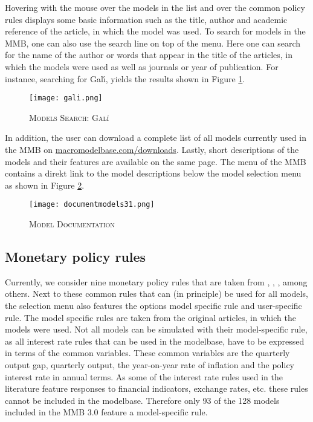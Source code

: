 Hovering with the mouse over the models in the list and over the common policy rules displays some basic information such as the title, author and academic reference of the article, in which the model was used. To search for models in the MMB, one can also use the search line on top of the menu. Here one can search for the name of the author or words that appear in the title of the articles, in which the models were used as well as journals or year of publication. For instance, searching for Gal{\'\i}, yields the results shown in Figure \ref{search}.

\begin{figure}[H]
	\centering
	\caption{\textsc{Models Search: Gal{\'\i}}}
	\vspace{0.2cm}
	\texttt{[image: gali.png]}\\
	\label{search}
\end{figure}

In addition, the user can download a complete list of all models currently used in the MMB on \url{macromodelbase.com/downloads}. Lastly, short descriptions of the models and their features are available on the same page. The menu of the MMB contains a direkt link to the model descriptions below the model selection menu as shown in Figure \ref{docmod}.
\begin{figure}[H]
	\centering
	\caption{\textsc{Model Documentation}}
	\vspace{0.2cm}
	\texttt{[image: documentmodels31.png]}\\
	\label{docmod}
\end{figure}

\subsection*{Monetary policy rules}



Currently, we consider nine monetary policy rules that are taken from \cite{Taylor1993}, \cite{LevinWielandWilliams2003}, \cite{SmetsWouters2007}, among others. Next to these common rules that can (in principle) be used for all models, the selection menu also features the options model specific rule and user-specific rule. 
The model specific rules are taken from the original articles, in which the models were used. Not all models can be simulated with their model-specific rule, as all interest rate rules that can be used in the modelbase, have to be expressed in terms of the common variables. These common variables are the quarterly output gap, quarterly output, the year-on-year rate of inflation and the policy interest rate in annual terms. As some of the interest rate rules used in the literature feature responses to financial indicators, exchange rates, etc. these rules cannot be included in the modelbase. Therefore only 93 of the 128 models included in the MMB 3.0 feature a model-specific rule. 

